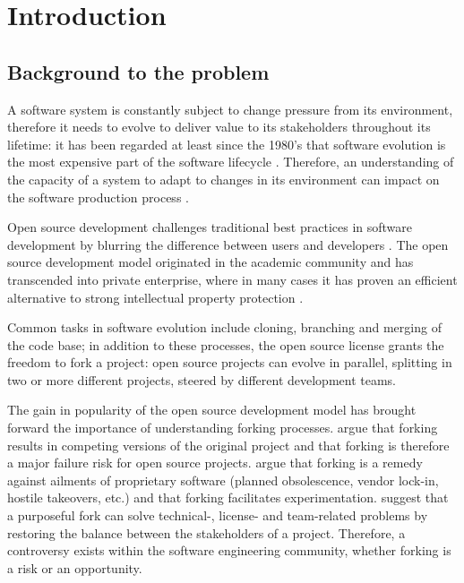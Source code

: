 
\chapter{Introduction} %

\label{Chapter1} %


\section{Background to the problem}
A software system is constantly subject to change pressure from its environment, therefore it needs to evolve to deliver value to its stakeholders throughout its lifetime: it has been regarded at least since the 1980's that software evolution is the most expensive part of the software lifecycle \citep{Lehman1980a}. Therefore, an understanding of the capacity of a system to adapt to changes in its environment can impact on the software production process \citep{Yu2006a}.

Open source development challenges traditional best practices in software development by blurring the difference between users and developers \citep{Hippel2003}. The open source development model originated in the academic community and has transcended into private enterprise, where in many cases it has proven an efficient alternative to strong intellectual property protection \citep{Kogut2001a}.

Common tasks in software evolution include cloning, branching and merging of the code base; in addition to these processes, the open source license grants the freedom to fork a project: open source projects can evolve in parallel, splitting in two or more different projects, steered by different development teams.

The gain in popularity of the open source development model has brought forward the importance of understanding forking processes. \citet{Kogut2001a} argue that forking results in competing versions of the original project and that forking is therefore a major failure risk for open source projects. \citet{Nyman2013a} argue that forking is a remedy against ailments of proprietary software (planned obsolescence, vendor lock-in, hostile takeovers, etc.) and that forking facilitates experimentation. \citet{Robles2012a} suggest that a purposeful fork can solve technical-, license- and team-related problems by restoring the balance between the stakeholders of a project. Therefore, a controversy exists within the software engineering community, whether forking is a risk or an opportunity.

